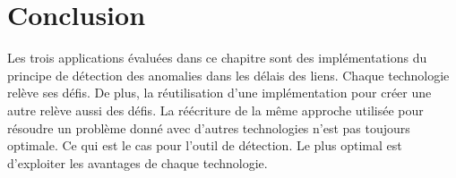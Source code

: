 \section{Conclusion}

Les trois applications évaluées dans ce chapitre sont des  implémentations du principe de détection des anomalies dans les délais des liens. Chaque technologie relève ses défis. De plus, la réutilisation d'une implémentation pour   créer une autre relève aussi des défis. 
La réécriture de la même  approche utilisée pour résoudre un problème donné avec d'autres technologies n'est pas toujours optimale. Ce qui est le cas pour l'outil de détection. Le plus optimal est d'exploiter les avantages de chaque technologie. 











